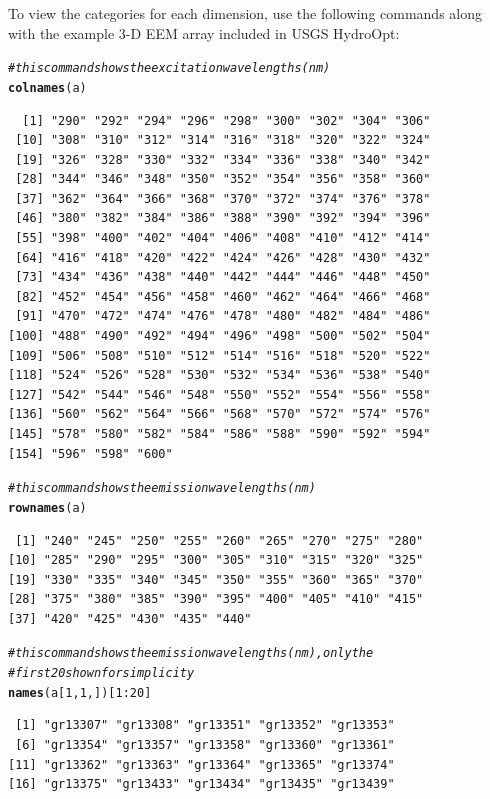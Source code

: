 \documentclass[a4paper,11pt]{article}\usepackage[]{graphicx}\usepackage[]{color}
\makeatletter
\newcommand{\hlnum}[1]{\textcolor[rgb]{0.686,0.059,0.569}{#1}}%
\newcommand{\hlcom}[1]{\textcolor[rgb]{0.678,0.584,0.686}{\textit{#1}}}%
\newcommand{\hlopt}[1]{\textcolor[rgb]{0,0,0}{#1}}%
\newcommand{\hlstd}[1]{\textcolor[rgb]{0.345,0.345,0.345}{#1}}%
\newcommand{\hlkwd}[1]{\textcolor[rgb]{0.737,0.353,0.396}{\textbf{#1}}}%
\newenvironment{kframe}{%
 \def\at@end@of@kframe{}%
 \ifinner\ifhmode%
  \def\at@end@of@kframe{\end{minipage}}%
  \begin{minipage}{\columnwidth}%
 \fi\fi%
 \def\FrameCommand##1{\hskip\@totalleftmargin \hskip-\fboxsep
 \colorbox{shadecolor}{##1}\hskip-\fboxsep
     \hskip-\linewidth \hskip-\@totalleftmargin \hskip\columnwidth}%
 \MakeFramed {\advance\hsize-\width
   \@totalleftmargin\z@ \linewidth\hsize
   \@setminipage}}%
 {\par\unskip\endMakeFramed%
 \at@end@of@kframe}
\newenvironment{knitrout}{}{} %
\makeatother
\begin{document}
To view the categories for each dimension, use the following commands along with the example 3-D EEM array included in USGS HydroOpt:

\begin{knitrout}
\color{fgcolor}\begin{kframe}
\begin{alltt}
\hlcom{# this command shows the excitation wavelengths (nm)}
\hlkwd{colnames}\hlstd{(a)}
\end{alltt}
\begin{verbatim}
  [1] "290" "292" "294" "296" "298" "300" "302" "304" "306"
 [10] "308" "310" "312" "314" "316" "318" "320" "322" "324"
 [19] "326" "328" "330" "332" "334" "336" "338" "340" "342"
 [28] "344" "346" "348" "350" "352" "354" "356" "358" "360"
 [37] "362" "364" "366" "368" "370" "372" "374" "376" "378"
 [46] "380" "382" "384" "386" "388" "390" "392" "394" "396"
 [55] "398" "400" "402" "404" "406" "408" "410" "412" "414"
 [64] "416" "418" "420" "422" "424" "426" "428" "430" "432"
 [73] "434" "436" "438" "440" "442" "444" "446" "448" "450"
 [82] "452" "454" "456" "458" "460" "462" "464" "466" "468"
 [91] "470" "472" "474" "476" "478" "480" "482" "484" "486"
[100] "488" "490" "492" "494" "496" "498" "500" "502" "504"
[109] "506" "508" "510" "512" "514" "516" "518" "520" "522"
[118] "524" "526" "528" "530" "532" "534" "536" "538" "540"
[127] "542" "544" "546" "548" "550" "552" "554" "556" "558"
[136] "560" "562" "564" "566" "568" "570" "572" "574" "576"
[145] "578" "580" "582" "584" "586" "588" "590" "592" "594"
[154] "596" "598" "600"
\end{verbatim}
\begin{alltt}
\hlcom{# this command shows the emission wavelengths (nm)}
\hlkwd{rownames}\hlstd{(a)}
\end{alltt}
\begin{verbatim}
 [1] "240" "245" "250" "255" "260" "265" "270" "275" "280"
[10] "285" "290" "295" "300" "305" "310" "315" "320" "325"
[19] "330" "335" "340" "345" "350" "355" "360" "365" "370"
[28] "375" "380" "385" "390" "395" "400" "405" "410" "415"
[37] "420" "425" "430" "435" "440"
\end{verbatim}
\begin{alltt}
\hlcom{# this command shows the emission wavelengths (nm), only the}
\hlcom{# first 20 shown for simplicity}
\hlkwd{names}\hlstd{(a[}\hlnum{1}\hlstd{,} \hlnum{1}\hlstd{, ])[}\hlnum{1}\hlopt{:}\hlnum{20}\hlstd{]}
\end{alltt}
\begin{verbatim}
 [1] "gr13307" "gr13308" "gr13351" "gr13352" "gr13353"
 [6] "gr13354" "gr13357" "gr13358" "gr13360" "gr13361"
[11] "gr13362" "gr13363" "gr13364" "gr13365" "gr13374"
[16] "gr13375" "gr13433" "gr13434" "gr13435" "gr13439"
\end{verbatim}
\end{kframe}
\end{knitrout}
\end{document}
